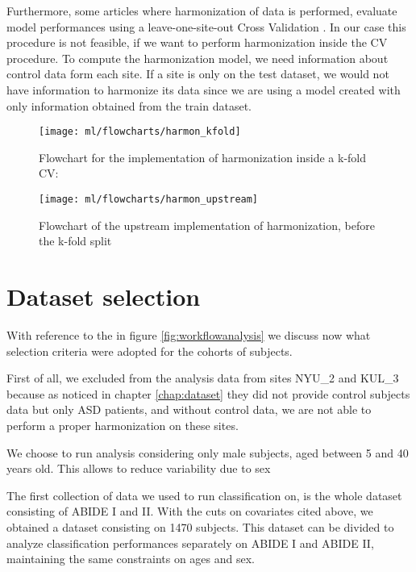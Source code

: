 \documentclass[11pt]{report}
\begin{document}
Furthermore, some articles where harmonization of data is performed, evaluate model performances using a leave-one-site-out Cross Validation \cite{spera-2019} \cite{ingalhalikar-2021}.
In our case this procedure is not feasible, if we want to perform harmonization inside the CV procedure. 
To compute the harmonization model, we need information about control data form each site. 
If a site is only on the test dataset, we would not have information to harmonize its data since we are using a model created with only information obtained from the train dataset. 


\begin{figure}[h!]
\centering
\texttt{[image: ml/flowcharts/harmon\_kfold]}
\caption{Flowchart for the implementation of harmonization inside a k-fold CV: }
\label{fig:harmon_kfold_flowchart}
\end{figure}



\begin{figure}[h!]
\centering
\texttt{[image: ml/flowcharts/harmon\_upstream]}
\caption{Flowchart of the upstream implementation of harmonization, before the k-fold split}
\label{fig:harmon_upstream_flowchart}
\end{figure}


\section{Dataset selection} \label{sec:dataset_selection}

With reference to the   in figure \ref{fig:workflowanalysis} we discuss now what selection criteria were adopted for the cohorts of subjects.

First of all, we excluded from the analysis data from sites NYU\_2 and KUL\_3 because as noticed in chapter \ref{chap:dataset} they did not provide control subjects data but only ASD patients, and without control data, we are not able to perform a proper harmonization on these sites.

We choose to run analysis considering only male subjects, aged between 5 and 40 years old.
This allows to reduce variability due to sex

The first collection of data we used to run classification on, is the whole dataset consisting of ABIDE I and II.
With the cuts on covariates cited above, we obtained a dataset consisting on 1470 subjects.
This dataset can be divided to analyze classification performances separately on ABIDE I and ABIDE II, maintaining the same constraints on ages and sex.
\end{document}
